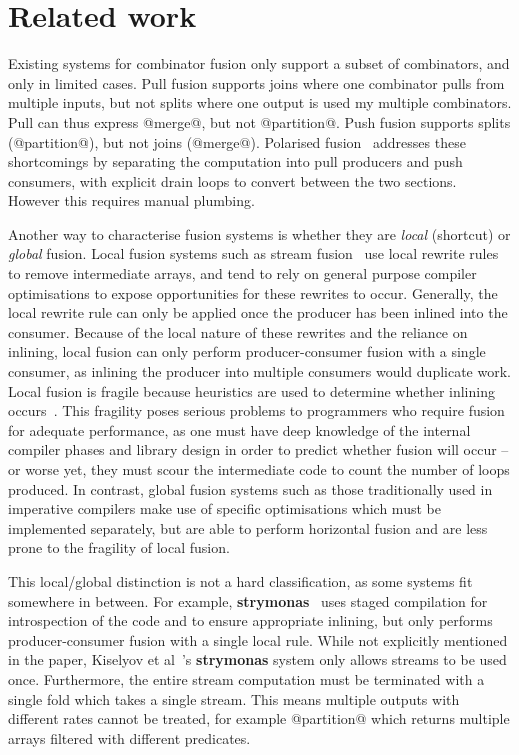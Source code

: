 \section{Related work}

Existing systems for combinator fusion only support a subset of combinators, and only in limited cases.
Pull fusion supports joins where one combinator pulls from multiple inputs, but not splits where one output is used my multiple combinators.
Pull can thus express @merge@, but not @partition@.
Push fusion supports splits (@partition@), but not joins (@merge@).
Polarised fusion~\cite{lippmeier2016polarized} addresses these shortcomings by separating the computation into pull producers and push consumers, with explicit drain loops to convert between the two sections. However this requires manual plumbing.

Another way to characterise fusion systems is whether they are \emph{local} (shortcut) or \emph{global} fusion.
Local fusion systems such as stream fusion~\cite{coutts2007stream} use local rewrite rules to remove intermediate arrays, and tend to rely on general purpose compiler optimisations to expose opportunities for these rewrites to occur.
Generally, the local rewrite rule can only be applied once the producer has been inlined into the consumer.
Because of the local nature of these rewrites and the reliance on inlining, local fusion can only perform producer-consumer fusion with a single consumer, as inlining the producer into multiple consumers would duplicate work.
Local fusion is fragile because heuristics are used to determine whether inlining occurs~\cite{lippmeier2013data}.
This fragility poses serious problems to programmers who require fusion for adequate performance, as one must have deep knowledge of the internal compiler phases and library design in order to predict whether fusion will occur -- or worse yet, they must scour the intermediate code to count the number of loops produced. 
In contrast, global fusion systems such as those traditionally used in imperative compilers make use of specific optimisations which must be implemented separately, but are able to perform horizontal fusion and are less prone to the fragility of local fusion.

This local/global distinction is not a hard classification, as some systems fit somewhere in between.
For example, {\bf strymonas}~\cite{kiselyov2016stream} uses staged compilation for introspection of the code and to ensure appropriate inlining, but only performs producer-consumer fusion with a single local rule.
While not explicitly mentioned in the paper, Kiselyov et al~\cite{kiselyov2016stream}'s {\bf strymonas} system only allows streams to be used once.
Furthermore, the entire stream computation must be terminated with a single fold which takes a single stream.
This means multiple outputs with different rates cannot be treated, for example @partition@ which returns multiple arrays filtered with different predicates.

